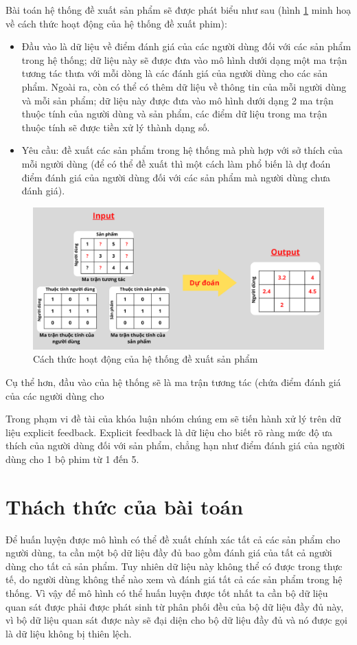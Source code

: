 Bài toán hệ thống đề xuất sản phẩm sẽ được phát biểu như sau (hình \ref{fig:chap1_rs} minh hoạ về cách thức hoạt động của hệ thống đề xuất phim):
\begin{itemize}
    \item Đầu vào là dữ liệu về điểm đánh giá của các người dùng đối với các sản phẩm trong hệ thống; dữ liệu này sẽ được đưa vào mô hình dưới dạng một ma trận tương tác thưa với mỗi dòng là các đánh giá của người dùng cho các sản phẩm. Ngoài ra, còn có thể có thêm dữ liệu về thông tin của mỗi người dùng và mỗi sản phẩm; dữ liệu này được đưa vào mô hình dưới dạng 2 ma trận thuộc tính của người dùng và sản phẩm, các điểm dữ liệu trong ma trận thuộc tính sẽ được tiền xử lý thành dạng số.

    \item Yêu cầu: đề xuất các sản phẩm trong hệ thống mà phù hợp với sở thích của mỗi người dùng (để có thể đề xuất thì một cách làm phổ biến là dự đoán điểm đánh giá của người dùng đối với các sản phẩm mà người dùng chưa đánh giá).
\end{itemize}

\begin{figure}[h]
    \centering
    \includegraphics[width=\textwidth]{images/Chapter1/rs.png}
    \caption{Cách thức hoạt động của hệ thống đề xuất sản phẩm}
    \label{fig:chap1_rs}
\end{figure}

Cụ thể hơn, đầu vào của hệ thống sẽ là ma trận tương tác (chứa điểm đánh giá của các người dùng cho

Trong phạm vi đề tài của khóa luận nhóm chúng em sẽ tiến hành xử lý trên dữ liệu explicit feedback. Explicit feedback là dữ liệu cho biết rõ ràng mức độ ưa thích của người dùng đối với sản phẩm, chẳng hạn như điểm đánh giá của người dùng cho 1 bộ phim từ 1 đến 5. 


\section{Thách thức của bài toán}
\label{section:thachthuc}
Để huấn luyện được mô hình có thể đề xuất chính xác tất cả các sản phẩm cho người dùng, ta cần một bộ dữ liệu đầy đủ bao gồm đánh giá của tất cả người dùng cho tất cả sản phẩm. Tuy nhiên dữ liệu này không thể có được trong thực tế, do người dùng không thể nào xem và đánh giá tất cả các sản phẩm trong hệ thống. Vì vậy để mô hình có thể huấn luyện được tốt nhất ta cần bộ dữ liệu quan sát được phải được phát sinh từ phân phối đều của bộ dữ liệu đầy đủ này, vì bộ dữ liệu quan sát được này sẽ đại diện cho bộ dữ liệu đầy đủ và nó được gọi là dữ liệu không bị thiên lệch. 

